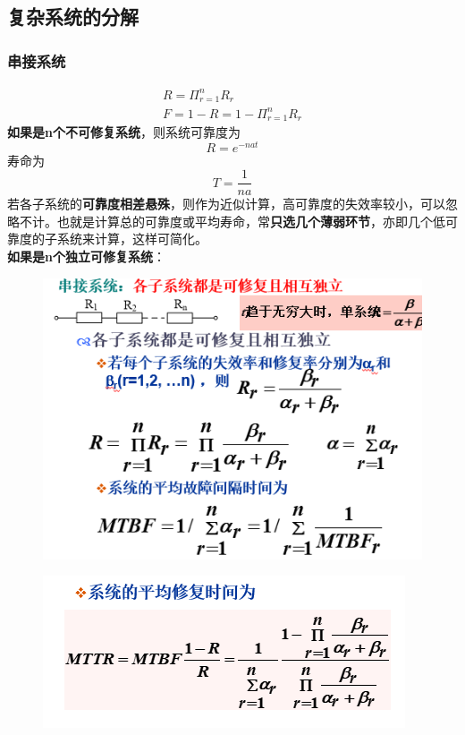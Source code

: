\subsection{复杂系统的分解
}
\subsubsection{串接系统}
\begin{gather}\label{key}
R = \varPi_{r = 1}^{n}R_r\\
F = 1-R = 1- \varPi_{r = 1}^{n}R_r
\end{gather}
\textbf{如果是n个不可修复系统}，则系统可靠度为
\begin{equation}\label{key}
R = e^{-nat}
\end{equation}
寿命为
\begin{equation}\label{key}
T= \frac{1}{na}
\end{equation}
若各子系统的\textbf{可靠度相差悬殊}，则作为近似计算，高可靠度的失效率较小，可以忽略不计。也就是计算总的可靠度或平均寿命，常\textbf{只选几个薄弱环节}，亦即几个低可靠度的子系统来计算，这样可简化。\\
\vspace{2pt}
\textbf{如果是n个独立可修复系统}：
\begin{figure}[H]
	\centering
	\includegraphics[width=0.7\linewidth]{figures/screenshot091}
	\caption{}
	\label{fig:screenshot091}
\end{figure}
\begin{figure}[H]
	\centering
	\includegraphics[width=0.7\linewidth]{figures/screenshot092}
	\caption{}
	\label{fig:screenshot092}
\end{figure}
